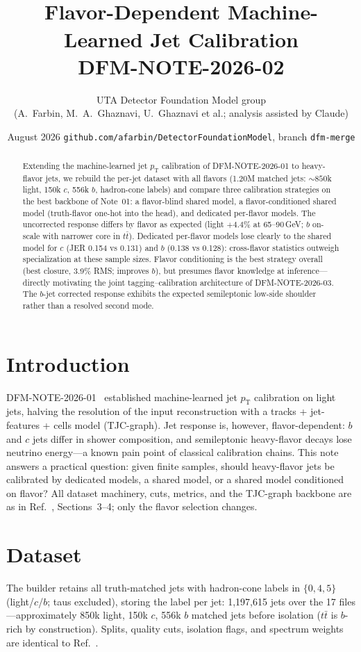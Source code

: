 \documentclass[11pt]{article}
\title{\vspace{-1.2cm}{\color{red!70!black}\small\bfseries INTERNAL DRAFT --- UTA DFM GROUP --- NOT AN OFFICIAL ATLAS DOCUMENT}\\[2mm]
\Large Flavor-Dependent Machine-Learned Jet Calibration\\[1mm]
\normalsize DFM-NOTE-2026-02}
\author{\small UTA Detector Foundation Model group\\
\small (A.~Farbin, M.~A.~Ghaznavi, U.~Ghaznavi et al.; analysis assisted by Claude)}
\date{\small August 2026 \;\textbullet\; \texttt{github.com/afarbin/DetectorFoundationModel}, branch \texttt{dfm-merge}}
\newcommand{\pt}{\ensuremath{p_\mathrm{T}}}
\begin{document}
\maketitle

\begin{abstract}
Extending the machine-learned jet \pt{} calibration of DFM-NOTE-2026-01 to
heavy-flavor jets, we rebuild the per-jet dataset with all flavors (1.20M matched
jets: ${\sim}850$k light, 150k $c$, 556k $b$, hadron-cone labels) and compare three
calibration strategies on the best backbone of Note~01: a flavor-blind shared model,
a flavor-conditioned shared model (truth-flavor one-hot into the head), and dedicated
per-flavor models. The uncorrected response differs by flavor as expected (light
$+4.4\%$ at 65--90\,GeV; $b$ on-scale with narrower core in $t\bar t$). Dedicated
per-flavor models lose clearly to the shared model for $c$ (JER 0.154 vs 0.131) and
$b$ (0.138 vs 0.128): cross-flavor statistics outweigh specialization at these sample
sizes. Flavor conditioning is the best strategy overall (best closure, 3.9\% RMS;
improves $b$), but presumes flavor knowledge at inference---directly motivating the
joint tagging--calibration architecture of DFM-NOTE-2026-03. The $b$-jet corrected
response exhibits the expected semileptonic low-side shoulder rather than a resolved
second mode.
\end{abstract}

\section{Introduction}
DFM-NOTE-2026-01~\cite{note1} established machine-learned jet \pt{} calibration on
light jets, halving the resolution of the input reconstruction with a
tracks + jet-features + cells model (TJC-graph). Jet response is, however,
flavor-dependent: $b$ and $c$ jets differ in shower composition, and semileptonic
heavy-flavor decays lose neutrino energy---a known pain point of classical calibration
chains. This note answers a practical question: given finite samples, should
heavy-flavor jets be calibrated by dedicated models, a shared model, or a shared model
conditioned on flavor? All dataset machinery, cuts, metrics, and the TJC-graph
backbone are as in Ref.~\cite{note1}, Sections~3--4; only the flavor selection
changes.

\section{Dataset}
The builder retains all truth-matched jets with hadron-cone labels in $\{0,4,5\}$
(light/$c$/$b$; taus excluded), storing the label per jet: 1{,}197{,}615 jets over
the 17 files---approximately 850k light, 150k $c$, 556k $b$ matched jets before
isolation ($t\bar t$ is $b$-rich by construction). Splits, quality cuts, isolation
flags, and spectrum weights are identical to Ref.~\cite{note1}.
\end{document}
